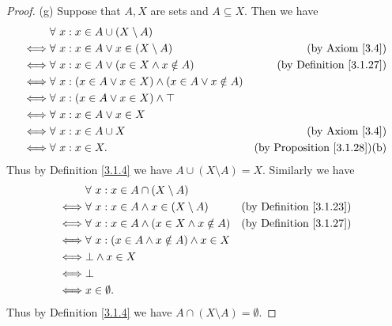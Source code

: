 \begin{proof}{(g)}
Suppose that \(A, X\) are sets and \(A \subseteq X\).
Then we have
\begin{align*}
& \forall\ x : x \in A \cup (X \setminus A) \\
\iff & \forall\ x : x \in A \lor x \in (X \setminus A) & \text{(by Axiom \ref{3.4})} \\
\iff & \forall\ x : x \in A \lor (x \in X \land x \notin A) & \text{(by Definition \ref{3.1.27})} \\
\iff & \forall\ x : (x \in A \lor x \in X) \land (x \in A \lor x \notin A) \\
\iff & \forall\ x : (x \in A \lor x \in X) \land \top \\
\iff & \forall\ x : x \in A \lor x \in X \\
\iff & \forall\ x : x \in A \cup X & \text{(by Axiom \ref{3.4})} \\
\iff & \forall\ x : x \in X. & \text{(by Proposition \ref{3.1.28})(b)}
\end{align*}
Thus by Definition \ref{3.1.4} we have \(A \cup (X \setminus A) = X\).
Similarly we have
\begin{align*}
& \forall\ x : x \in A \cap (X \setminus A) \\
\iff & \forall\ x : x \in A \land x \in (X \setminus A) & \text{(by Definition \ref{3.1.23})} \\
\iff & \forall\ x : x \in A \land (x \in X \land x \notin A) & \text{(by Definition \ref{3.1.27})} \\
\iff & \forall\ x : (x \in A \land x \notin A) \land x \in X \\
\iff & \bot \land x \in X \\
\iff & \bot \\
\iff & x \in \emptyset.
\end{align*}
Thus by Definition \ref{3.1.4} we have \(A \cap (X \setminus A) = \emptyset\).
\end{proof}

